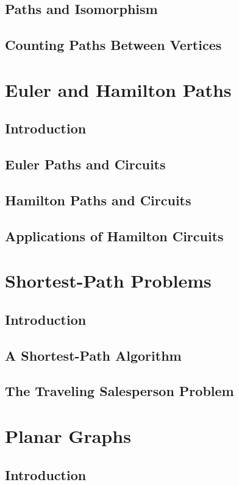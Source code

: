 \documentclass[11pt]{book}
\begin{document}
  \subsection{Paths and Isomorphism}
  \subsection{Counting Paths Between Vertices}
  
 \section{Euler and Hamilton Paths}
  \subsection{Introduction}
  \subsection{Euler Paths and Circuits}
  \subsection{Hamilton Paths and Circuits}
  \subsection{Applications of Hamilton Circuits}
  
 \section{Shortest-Path Problems}
  \subsection{Introduction}
  \subsection{A Shortest-Path Algorithm}
  \subsection{The Traveling Salesperson Problem}
  
 \section{Planar Graphs}
  \subsection{Introduction}
\end{document}
